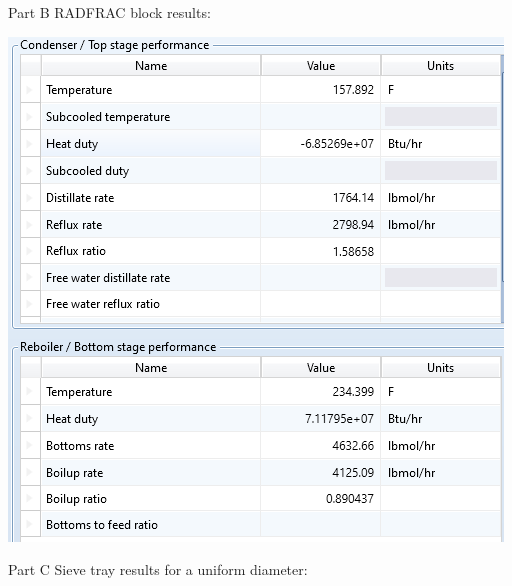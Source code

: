 \documentclass[12pt]{article}
\begin{document}
Part B RADFRAC block results:
\begin{center}
    \includegraphics{radfrac results B.png}
\end{center}
Part C Sieve tray results for a uniform diameter:
\end{document}
